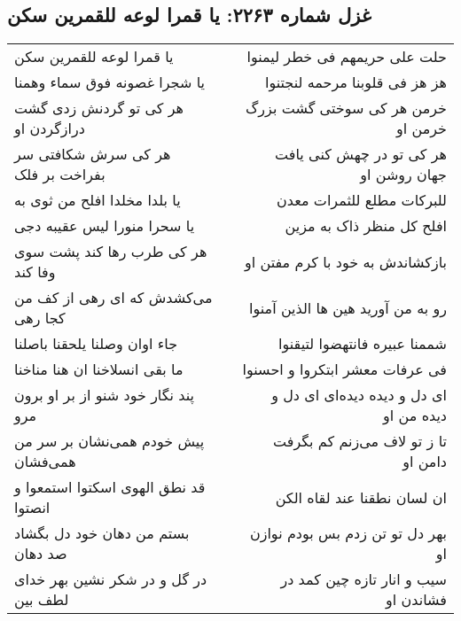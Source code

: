 \begin{center}
\section*{غزل شماره ۲۲۶۳: یا قمرا لوعه للقمرین سکن}
\label{sec:2263}
\begin{longtable}{l p{0.5cm} r}
یا قمرا لوعه للقمرین سکن
&&
حلت علی حریمهم فی خطر لیمنوا
\\
یا شجرا غصونه فوق سماء وهمنا
&&
هز هز فی قلوبنا مرحمه لنجتنوا
\\
هر کی تو گردنش زدی گشت درازگردن او
&&
خرمن هر کی سوختی گشت بزرگ خرمن او
\\
هر کی سرش شکافتی سر بفراخت بر فلک
&&
هر کی تو در چهش کنی یافت جهان روشن او
\\
یا بلدا مخلدا افلح من ثوی به
&&
للبرکات مطلع للثمرات معدن
\\
یا سحرا منورا لیس عقیبه دجی
&&
افلح کل منظر ذاک به مزین
\\
هر کی طرب رها کند پشت سوی وفا کند
&&
بازکشاندش به خود با کرم مفتن او
\\
می‌کشدش که ای رهی از کف من کجا رهی
&&
رو به من آورید هین ها الذین آمنوا
\\
جاء اوان وصلنا یلحقنا باصلنا
&&
شممنا عبیره فانتهضوا لتیقنوا
\\
ما بقی انسلاخنا ان هنا مناخنا
&&
فی عرفات معشر ابتکروا و احسنوا
\\
پند نگار خود شنو از بر او برون مرو
&&
ای دل و دیده دیده‌ای ای دل و دیده من او
\\
پیش خودم همی‌نشان بر سر من همی‌فشان
&&
تا ز تو لاف می‌زنم کم بگرفت دامن او
\\
قد نطق الهوی اسکتوا استمعوا و انصتوا
&&
ان لسان نطقنا عند لقاه الکن
\\
بستم من دهان خود دل بگشاد صد دهان
&&
بهر دل تو تن زدم بس بودم نوازن او
\\
در گل و در شکر نشین بهر خدای لطف بین
&&
سیب و انار تازه چین کمد در فشاندن او
\\
\end{longtable}
\end{center}
